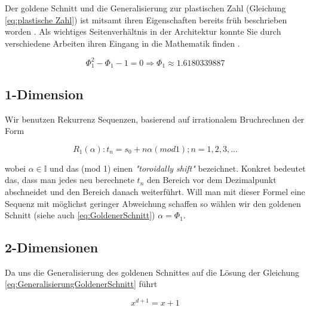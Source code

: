 Der goldene Schnitt und die Generalisierung zur plastischen Zahl (Gleichung \ref{eq:plastische Zahl})
ist mitsamt ihren Eigenschaften bereits früh beschrieben worden \cite{vanderlaanplasticnumber}.
Als wichtiges Seitenverhältnis in der Architektur konnte Sie durch verschiedene Arbeiten ihren 
Eingang in die Mathematik finden \cite{krcadinac2006new}.

\begin{tcolorbox}[rightrule=3mm, rounded corners=east]
    \begin{equation}\label{eq:GoldenerSchnitt}
        \Phi_{1}^{2} - \Phi_{1} - 1 = 0 \Longrightarrow \Phi_{1} \approx 1.6180339887
    \end{equation}
\end{tcolorbox}

\label{subsec:1-Dimension}
\subsection{1-Dimension}
Wir benutzen Rekurrenz Sequenzen, basierend auf irrationalem 
Bruchrechnen der Form

\begin{tcolorbox}[rightrule=3mm, rounded corners=east]
    \begin{equation}\label{eq:Rekurrenz Sequenz}
        R_{1}(\alpha) : t_n = s_0 + n\alpha(mod 1); n = 1,2,3,...
    \end{equation}
\end{tcolorbox}

wobei $\alpha \in \mathbb{I}$ und das (mod 1) einen \textit{"toroidally shift"}
bezeichnet. Konkret bedeutet das, dass man jedes neu berechnete $t_{n}$ den Bereich vor dem Dezimalpunkt abschneidet 
und den Bereich danach weiterführt. Will man mit dieser Formel eine Sequenz mit möglichst geringer
Abweichung schaffen so wählen wir den goldenen Schnitt (siehe auch \ref{eq:GoldenerSchnitt})
$\alpha = \Phi_{1}$.

\label{subsec:2-Dimensionen}
\subsection{2-Dimensionen}

Da uns die Generalisierung des goldenen Schnittes auf die Lösung der Gleichung
\ref{eq:GeneralisierungGoldenerSchnitt} führt

\begin{tcolorbox}[rightrule=3mm, rounded corners=east]
    \begin{equation}\label{eq:GeneralisierungGoldenerSchnitt}
        x^{d+1} = x+1
    \end{equation}
\end{tcolorbox}

